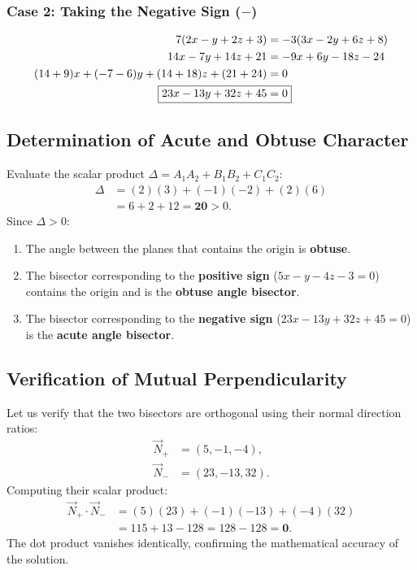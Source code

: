 \subsubsection{Case 2: Taking the Negative Sign ($-$)}
\begin{align}
    7(2x - y + 2z + 3) &= -3(3x - 2y + 6z + 8) \nonumber\\
    14x - 7y + 14z + 21 &= -9x + 6y - 18z - 24 \nonumber\\
    (14 + 9)x + (-7 - 6)y + (14 + 18)z + (21 + 24) &= 0 \nonumber\\
    \Aboxed{23x - 13y + 32z + 45 &= 0} \label{eq:bis_minus}
\end{align}

\subsection{Determination of Acute and Obtuse Character}
Evaluate the scalar product $\Delta = A_1 A_2 + B_1 B_2 + C_1 C_2$:
\begin{align}
    \Delta &= (2)(3) + (-1)(-2) + (2)(6) \nonumber\\
    &= 6 + 2 + 12 = \mathbf{20} > 0.
\end{align}
Since $\Delta > 0$:
\begin{enumerate}
    \item The angle between the planes that contains the origin is \textbf{obtuse}.
    \item The bisector corresponding to the \textbf{positive sign} ($5x - y - 4z - 3 = 0$) contains the origin and is the \textbf{obtuse angle bisector}.
    \item The bisector corresponding to the \textbf{negative sign} ($23x - 13y + 32z + 45 = 0$) is the \textbf{acute angle bisector}.
\end{enumerate}

\subsection{Verification of Mutual Perpendicularity}
Let us verify that the two bisectors are orthogonal using their normal direction ratios:
\begin{align}
    \vec{N}_+ &= (5, -1, -4), \\
    \vec{N}_- &= (23, -13, 32).
\end{align}
Computing their scalar product:
\begin{align}
    \vec{N}_+ \cdot \vec{N}_- &= (5)(23) + (-1)(-13) + (-4)(32) \nonumber\\
    &= 115 + 13 - 128 = 128 - 128 = \mathbf{0}.
\end{align}
The dot product vanishes identically, confirming the mathematical accuracy of the solution.
